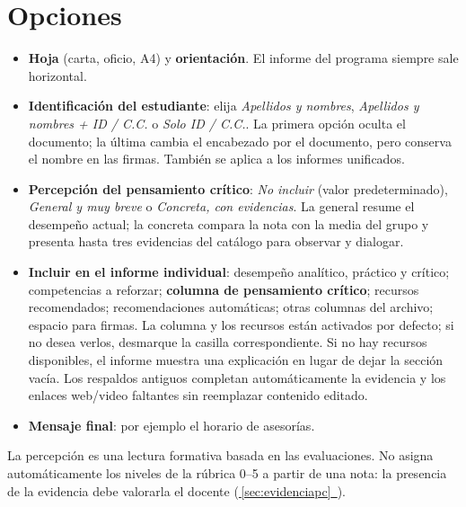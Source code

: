 \documentclass[11pt,letterpaper,oneside]{report}
\newcommand{\ver}[1]{\hyperref[#1]{\faArrowCircleRight\,\ref*{#1}~\nameref*{#1}}}
\begin{document}
\section{Opciones}\label{sec:opcionesinf}
\begin{itemize}
  \item \textbf{Hoja} (carta, oficio, A4) y \textbf{orientación}. El informe del programa siempre sale horizontal.
  \item \textbf{Identificación del estudiante}: elija \emph{Apellidos y nombres}, \emph{Apellidos y nombres + ID / C.C.} o \emph{Solo ID / C.C.}. La primera opción oculta el documento; la última cambia el encabezado por el documento, pero conserva el nombre en las firmas. También se aplica a los informes unificados.
  \item \textbf{Percepción del pensamiento crítico}: \emph{No incluir} (valor predeterminado), \emph{General y muy breve} o \emph{Concreta, con evidencias}. La general resume el desempeño actual; la concreta compara la nota con la media del grupo y presenta hasta tres evidencias del catálogo para observar y dialogar.
  \item \textbf{Incluir en el informe individual}: desempeño analítico, práctico y crítico; competencias a reforzar; \textbf{columna de pensamiento crítico}; recursos recomendados; recomendaciones automáticas; otras columnas del archivo; espacio para firmas. La columna y los recursos están activados por defecto; si no desea verlos, desmarque la casilla correspondiente. Si no hay recursos disponibles, el informe muestra una explicación en lugar de dejar la sección vacía. Los respaldos antiguos completan automáticamente la evidencia y los enlaces web/video faltantes sin reemplazar contenido editado.
  \item \textbf{Mensaje final}: por ejemplo el horario de asesorías.
\end{itemize}
\begin{atencion}
La percepción es una lectura formativa basada en las evaluaciones. No asigna automáticamente los niveles de la rúbrica 0--5 a partir de una nota: la presencia de la evidencia debe valorarla el docente (\ver{sec:evidenciapc}).
\end{atencion}
\end{document}
